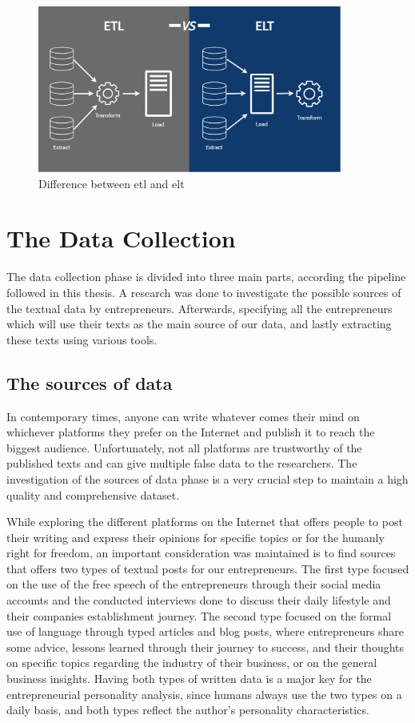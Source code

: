 \begin{figure}[H]
\centering
\includegraphics[width=10cm]{etlVSelt}
\caption{Difference between \ac{etl} and \ac{elt} \cite{Leong_2023}}
\label{fig:etlVselt}
\end{figure}

\section{The Data Collection}
The data collection phase is divided into three main parts, according the pipeline followed in this thesis. A research was done to investigate the possible sources of the textual data by entrepreneurs. Afterwards, specifying all the entrepreneurs which will use their texts as the main source of our data, and lastly extracting these texts using various tools.

\subsection{The sources of data}
In contemporary times, anyone can write whatever comes their mind on whichever platforms they prefer on the Internet and publish it to reach the biggest audience. Unfortunately, not all platforms are trustworthy of the published texts and can give multiple false data to the researchers. The investigation of the sources of data phase is a very crucial step to maintain a high quality and comprehensive dataset.

While exploring the different platforms on the Internet that offers people to post their writing and express their opinions for specific topics or for the humanly right for freedom, an important consideration was maintained is to find sources that offers two types of textual posts for our entrepreneurs. The first type focused on the use of the free speech of the entrepreneurs through their social media accounts and the conducted interviews done to discuss their daily lifestyle and their companies establishment journey. The second type focused on the formal use of language through typed articles and blog posts, where entrepreneurs share some advice, lessons learned through their journey to success, and their thoughts on specific topics regarding the industry of their business, or on the general business insights. Having both types of written data is a major key for the entrepreneurial personality analysis, since humans always use the two types on a daily basis, and both types reflect the author's personality characteristics.

